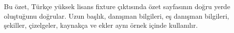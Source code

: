 Bu özet, Türkçe yüksek lisans fixture çıktısında özet sayfasının doğru yerde
oluştuğunu doğrular. Uzun başlık, danışman bilgileri, eş danışman bilgileri,
şekiller, çizelgeler, kaynakça ve ekler aynı örnek içinde kullanılır.
